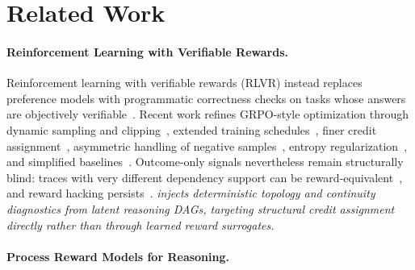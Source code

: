 \section{Related Work}
\label{sec:related_work}

\paragraph{Reinforcement Learning with Verifiable Rewards.}
Reinforcement learning with verifiable rewards (RLVR) instead replaces preference models with programmatic correctness checks on tasks whose answers are objectively verifiable~\citep{shao2024deepseekmath,deepseekr1,lambert2024tulu3,zeng2503simplerlzoo}. 
Recent work refines GRPO-style optimization through dynamic sampling and clipping~\citep{yu2025dapo}, extended training schedules~\citep{liu2025prorl}, finer credit assignment~\citep{kazemnejad2025vineppo}, asymmetric handling of negative samples~\citep{zhu2025negsample}, entropy regularization~\citep{cui2025entropy}, and simplified baselines~\citep{ahmadian2024back,hu2025reinforce++}. Outcome-only signals nevertheless remain structurally blind: traces with very different dependency support can be reward-equivalent~\citep{chen2026does}, and reward hacking persists~\citep{gao2023scaling,skalse2022defining}. \textit{\method injects deterministic topology and continuity diagnostics from latent reasoning DAGs, targeting structural credit assignment directly rather than through learned reward surrogates.}

\paragraph{Process Reward Models for Reasoning.}

